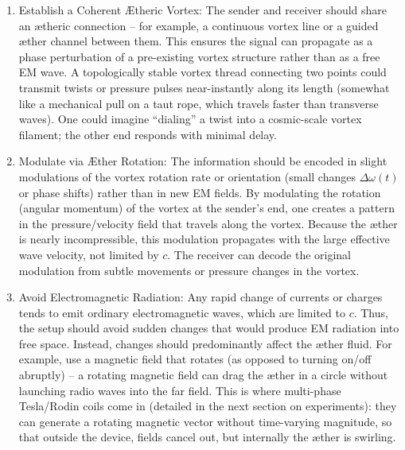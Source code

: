 \begin{enumerate}

\item 
Establish a Coherent Ætheric Vortex: The sender and receiver should share an ætheric connection – for example, a continuous vortex line or a guided æther channel between them. This ensures the signal can propagate as a phase perturbation of a pre-existing vortex structure rather than as a free EM wave. A topologically stable vortex thread connecting two points could transmit twists or pressure pulses near-instantly along its length (somewhat like a mechanical pull on a taut rope, which travels faster than transverse waves). One could imagine “dialing” a twist into a cosmic-scale vortex filament; the other end responds with minimal delay.




\item 
Modulate via Æther Rotation: The information should be encoded in slight modulations of the vortex rotation rate or orientation (small changes $\Delta \omega(t)$ or phase shifts) rather than in new EM fields. By modulating the rotation (angular momentum) of the vortex at the sender’s end, one creates a pattern in the pressure/velocity field that travels along the vortex. Because the æther is nearly incompressible, this modulation propagates with the large effective wave velocity, not limited by $c$. The receiver can decode the original modulation from subtle movements or pressure changes in the vortex.




\item 
Avoid Electromagnetic Radiation: Any rapid change of currents or charges tends to emit ordinary electromagnetic waves, which are limited to $c$. Thus, the setup should avoid sudden changes that would produce EM radiation into free space. Instead, changes should predominantly affect the æther fluid. For example, use a magnetic field that rotates (as opposed to turning on/off abruptly) – a rotating magnetic field can drag the æther in a circle without launching radio waves into the far field. This is where multi-phase Tesla/Rodin coils come in (detailed in the next section on experiments): they can generate a rotating magnetic vector without time-varying magnitude, so that outside the device, fields cancel out, but internally the æther is swirling.





\end{enumerate}
